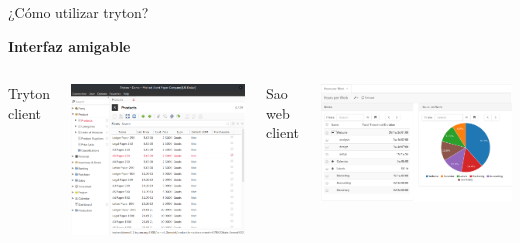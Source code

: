     \begin{frame}[fragile=singleslide]{¿Cómo utilizar tryton?}
        \vspace*{-1cm}
        \begin{flushright}
            {\color{TurkishRose}\textbf{Interfaz amigable}}
        \end{flushright}
        \vspace*{-0.5cm}
        \begin{columns}
            \begin{center}
                {\color{ChetwodeBlue}Tryton client}
            \end{center}
            \vspace*{-0.1cm}
            \includegraphics[width=\textwidth]{./Images/demo-products.png}
            \begin{center}
                {\color{ChetwodeBlue}Sao web client}
            \end{center}
            \includegraphics[width=\textwidth]{./Images/tryton-sao.png}

\end{columns}
\end{frame}
